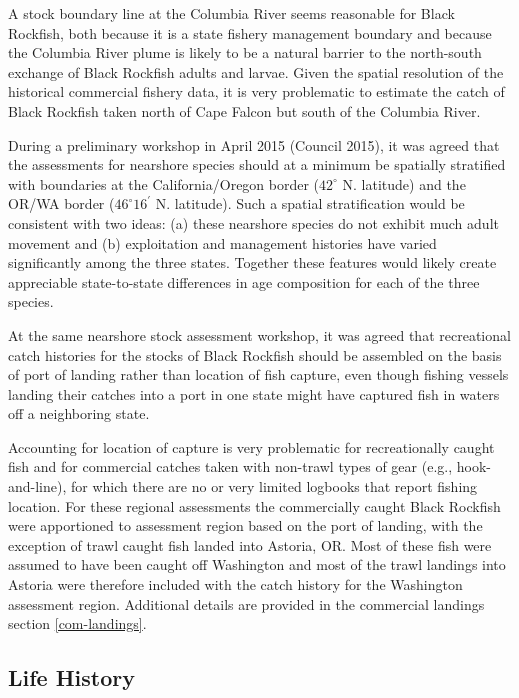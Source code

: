 \documentclass[11pt,
  english,
  letterpaper,
]{article}
\begin{document}
A stock boundary line at the Columbia River seems reasonable for Black Rockfish, both because it is a state fishery management boundary and because the Columbia River plume is likely to be a natural barrier to the north-south exchange of Black Rockfish adults and larvae. Given the spatial resolution of the historical commercial fishery data, it is very problematic to estimate the catch of Black Rockfish taken north of Cape Falcon but south of the Columbia River.

During a preliminary workshop in April 2015 (Council 2015), it was agreed that the assessments for nearshore species should at a minimum be spatially stratified with boundaries at the California/Oregon border (\(42^\circ\) N. latitude) and the OR/WA border (\(46^\circ 16^\prime\) N. latitude). Such a spatial stratification would be consistent with two ideas: (a) these nearshore species do not exhibit much adult movement and (b) exploitation and management histories have varied significantly among the three states. Together these features would likely create appreciable state-to-state differences in age composition for each of the three species.

At the same nearshore stock assessment workshop, it was agreed that recreational catch histories for the stocks of Black Rockfish should be assembled on the basis of port of landing rather than location of fish capture, even though fishing vessels landing their catches into a port in one state might have captured fish in waters off a neighboring state.

Accounting for location of capture is very problematic for recreationally caught fish and for commercial catches taken with non-trawl types of gear (e.g., hook-and-line), for which there are no or very limited logbooks that report fishing location. For these regional assessments the commercially caught Black Rockfish were apportioned to assessment region based on the port of landing, with the exception of trawl caught fish landed into Astoria, OR. Most of these fish were assumed to have been caught off Washington and most of the trawl landings into Astoria were therefore included with the catch history for the Washington assessment region. Additional details are provided in the commercial landings section \ref{com-landings}.

\hypertarget{life-history}{%
\subsection{Life History}\label{life-history}}
\end{document}
